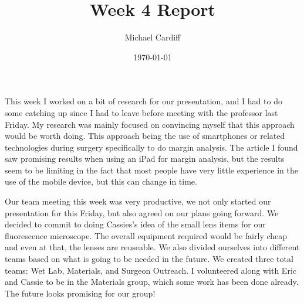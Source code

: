 \documentclass[12pt]{article}
\title{Week 4 Report}
\author{Michael Cardiff}
\date{\today}
\begin{document}
\maketitle

This week I worked on a bit of research for our presentation, and I had to do some catching up since I had to leave before meeting with the professor last Friday. My research was mainly focused on convincing myself that this approach would be worth doing. This approach being the use of smartphones or related technologies during surgery specifically to do margin analysis. The article I found saw promising results when using an iPad for margin analysis, but the results seem to be limiting in the fact that most people have very little experience in the use of the mobile device, but this can change in time.

Our team meeting this week was very productive, we not only started our presentation for this Friday, but also agreed on our plans going forward. We decided to commit to doing Cassies's idea of the small lens items for our fluorescence microscope. The overall equipment required would be fairly cheap and even at that, the lenses are reuseable. We also divided ourselves into different teams based on what is going to be needed in the future. We created three total teams: Wet Lab, Materials, and Surgeon Outreach. I volunteered along with Eric and Cassie to be in the Materials group, which some work has been done already. The future looks promising for our group!
\end{document}
